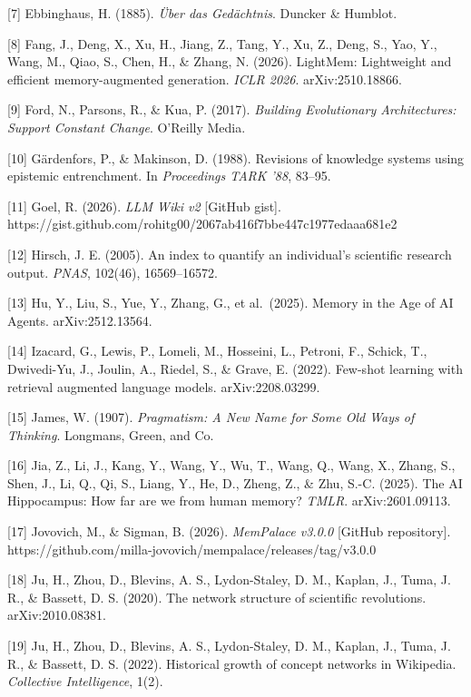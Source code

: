 \documentclass[
  11pt,
]{article}
\begin{document}
{[}7{]} Ebbinghaus, H. (1885). \emph{Über das Gedächtnis}. Duncker \&
Humblot.

{[}8{]} Fang, J., Deng, X., Xu, H., Jiang, Z., Tang, Y., Xu, Z., Deng,
S., Yao, Y., Wang, M., Qiao, S., Chen, H., \& Zhang, N. (2026).
LightMem: Lightweight and efficient memory-augmented generation.
\emph{ICLR 2026}. arXiv:2510.18866.

{[}9{]} Ford, N., Parsons, R., \& Kua, P. (2017). \emph{Building
Evolutionary Architectures: Support Constant Change}. O'Reilly Media.

{[}10{]} Gärdenfors, P., \& Makinson, D. (1988). Revisions of knowledge
systems using epistemic entrenchment. In \emph{Proceedings TARK '88},
83--95.

{[}11{]} Goel, R. (2026). \emph{LLM Wiki v2} {[}GitHub gist{]}.
https://gist.github.com/rohitg00/2067ab416f7bbe447c1977edaaa681e2

{[}12{]} Hirsch, J. E. (2005). An index to quantify an individual's
scientific research output. \emph{PNAS}, 102(46), 16569--16572.

{[}13{]} Hu, Y., Liu, S., Yue, Y., Zhang, G., et al.~(2025). Memory in
the Age of AI Agents. arXiv:2512.13564.

{[}14{]} Izacard, G., Lewis, P., Lomeli, M., Hosseini, L., Petroni, F.,
Schick, T., Dwivedi-Yu, J., Joulin, A., Riedel, S., \& Grave, E. (2022).
Few-shot learning with retrieval augmented language models.
arXiv:2208.03299.

{[}15{]} James, W. (1907). \emph{Pragmatism: A New Name for Some Old
Ways of Thinking}. Longmans, Green, and Co.

{[}16{]} Jia, Z., Li, J., Kang, Y., Wang, Y., Wu, T., Wang, Q., Wang,
X., Zhang, S., Shen, J., Li, Q., Qi, S., Liang, Y., He, D., Zheng, Z.,
\& Zhu, S.-C. (2025). The AI Hippocampus: How far are we from human
memory? \emph{TMLR}. arXiv:2601.09113.

{[}17{]} Jovovich, M., \& Sigman, B. (2026). \emph{MemPalace v3.0.0}
{[}GitHub repository{]}.
https://github.com/milla-jovovich/mempalace/releases/tag/v3.0.0

{[}18{]} Ju, H., Zhou, D., Blevins, A. S., Lydon-Staley, D. M., Kaplan,
J., Tuma, J. R., \& Bassett, D. S. (2020). The network structure of
scientific revolutions. arXiv:2010.08381.

{[}19{]} Ju, H., Zhou, D., Blevins, A. S., Lydon-Staley, D. M., Kaplan,
J., Tuma, J. R., \& Bassett, D. S. (2022). Historical growth of concept
networks in Wikipedia. \emph{Collective Intelligence}, 1(2).
\end{document}
